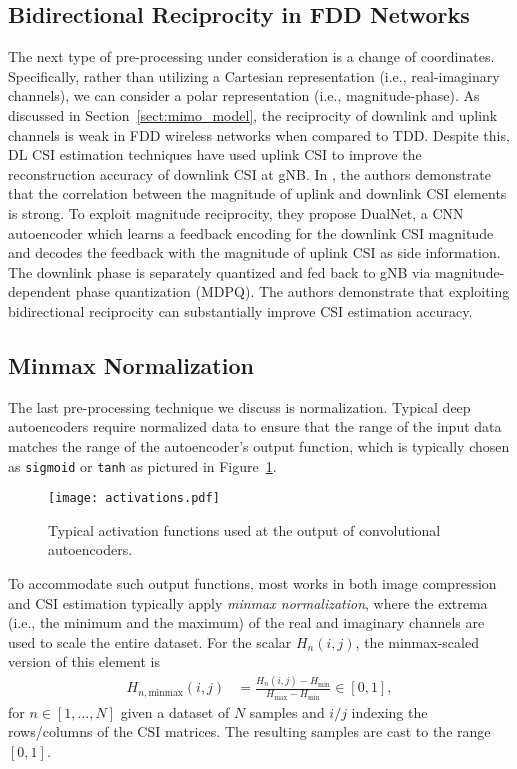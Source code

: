 \subsection{Bidirectional Reciprocity in FDD Networks}

The next type of pre-processing under consideration is a change of coordinates. Specifically, rather than utilizing a Cartesian representation (i.e., real-imaginary channels), we can consider a polar representation (i.e., magnitude-phase). As discussed in Section~\ref{sect:mimo_model}, the reciprocity of downlink and uplink channels is weak in FDD wireless networks when compared to TDD. Despite this, DL CSI estimation techniques have used uplink CSI to improve the reconstruction accuracy of downlink CSI at gNB. In \cite{ref:dualnet}, the authors demonstrate that the correlation between the magnitude of uplink and downlink CSI elements is strong. To exploit magnitude reciprocity, they propose DualNet, a CNN autoencoder which learns a feedback encoding for the downlink CSI magnitude and decodes the feedback with the magnitude of uplink CSI as side information. The downlink phase is separately quantized and fed back to gNB via magnitude-dependent phase quantization (MDPQ). The authors demonstrate that exploiting bidirectional reciprocity can substantially improve CSI estimation accuracy.

\subsection{Minmax Normalization}

The last pre-processing technique we discuss is normalization. Typical deep autoencoders require normalized data to ensure that the range of the input data matches the range of the autoencoder's output function, which is typically chosen as \texttt{sigmoid} or \texttt{tanh} as pictured in Figure~\ref{fig:ae_output_fx}. 
\begin{figure}[htb]
  \centering
  \texttt{[image: activations.pdf]}
  \caption{Typical activation functions used at the output of convolutional autoencoders.}
  \label{fig:ae_output_fx}
\end{figure}
To accommodate such output functions, most works in both image compression and CSI estimation typically apply \emph{minmax normalization}, where the extrema (i.e., the minimum and the maximum) of the real and imaginary channels are used to scale the entire dataset. For the scalar $H_n(i,j)$, the minmax-scaled version of this element is
\begin{align*}
	H_{n,\text{minmax}}(i,j) &= \frac{H_n(i,j)-H_{\text{min}}}{H_{\text{max}}-H_{\text{min}}} \in [0,1],
\end{align*}
for $n \in [1,\dots,N]$ given a dataset of $N$ samples and $i/j$ indexing the rows/columns of the CSI matrices. The resulting samples are cast to the range $[0,1]$. %

